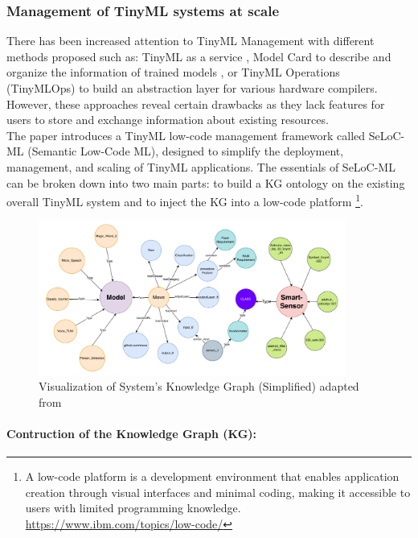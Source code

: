 \documentclass[twocolumn]{article}
\begin{document}
\subsubsection{Management of TinyML systems at scale}

There has been increased attention to TinyML Management with different methods proposed such as: TinyML as a service , Model Card to describe and organize the information of trained models \cite{mitchell_model_2019}, or TinyML Operations (TinyMLOps) \cite{antonini_tiny-mlops_2022} to build an abstraction layer for various hardware compilers. However, these approaches reveal certain drawbacks as they lack features for users to store and exchange information about existing resources. \\[0.1cm]

The paper introduces a TinyML low-code management framework called SeLoC-ML (Semantic Low-Code ML), designed to simplify the deployment, management, and scaling of TinyML applications. The essentials of SeLoC-ML can be broken down into two main parts: to build a KG ontology on the existing overall TinyML system and to inject the KG into a low-code platform \footnote{A low-code platform is a development environment that enables application creation through visual interfaces and minimal coding, making it accessible to users with limited programming knowledge. \url{https://www.ibm.com/topics/low-code/}}. 


\begin{figure}[t]
	\centerline{
	\includegraphics[width=0.9\textwidth,height=0.4\textheight ]{resource/KG.pdf}
	}
	\caption{Visualization of System's Knowledge Graph (Simplified) adapted from \cite{ren_tinyol_2021}}
	\label{KG}
\end{figure}


\paragraph{Contruction of the Knowledge Graph (KG):} 
\end{document}
